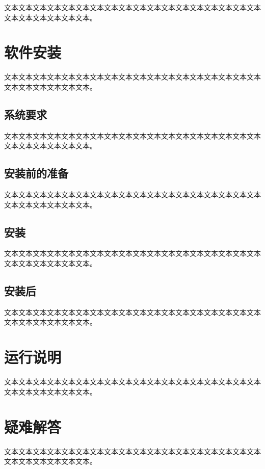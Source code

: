 \documentclass{suse-cs-thesis}
\begin{document}
文本文本文本文本文本文本文本文本文本文本文本文本文本文本文本文本文本文本文本文本文本文本文本文本。

\section{软件安装}

文本文本文本文本文本文本文本文本文本文本文本文本文本文本文本文本文本文本文本文本文本文本文本文本。

\subsection{系统要求}

文本文本文本文本文本文本文本文本文本文本文本文本文本文本文本文本文本文本文本文本文本文本文本文本。

\subsection{安装前的准备}

文本文本文本文本文本文本文本文本文本文本文本文本文本文本文本文本文本文本文本文本文本文本文本文本。

\subsection{安装}

文本文本文本文本文本文本文本文本文本文本文本文本文本文本文本文本文本文本文本文本文本文本文本文本。

\subsection{安装后}

文本文本文本文本文本文本文本文本文本文本文本文本文本文本文本文本文本文本文本文本文本文本文本文本。

\section{运行说明}

文本文本文本文本文本文本文本文本文本文本文本文本文本文本文本文本文本文本文本文本文本文本文本文本。

\section{疑难解答}

文本文本文本文本文本文本文本文本文本文本文本文本文本文本文本文本文本文本文本文本文本文本文本文本。
\end{document}
